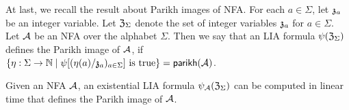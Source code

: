 At last, we recall the result about Parikh images of NFA. 
For each $a \in \Sigma$, let $\mathfrak{z}_a$ be an integer variable. Let $\mathfrak{Z}_\Sigma$ denote the set of integer variables $\mathfrak{z}_a$ for $a \in \Sigma$. 
Let $\mathcal{A}$ be an NFA over the alphabet $\Sigma$. Then 
we say that an LIA formula $\psi(\mathfrak{Z}_\Sigma)$ defines the Parikh image of $\mathcal{A}$, if $\{\eta: \Sigma \rightarrow \mathbb{N} \mid \psi[(\eta(a) /\mathfrak{z}_a)_{a \in \Sigma}] \mbox{ is true}\} = \mathsf{parikh}(\mathcal{A})$. 

\begin{theorem}\label{thm-nfa-parikh}
Given an NFA $\mathcal{A}$,  an existential LIA formula $\psi_{\mathcal{A}}(\mathfrak{Z}_\Sigma)$ can be computed in linear time that defines the Parikh image of $\mathcal{A}$.
\end{theorem}

